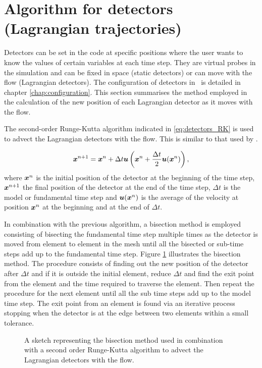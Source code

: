 \section{Algorithm for detectors (Lagrangian trajectories)}
  
Detectors can be set in the code at specific positions where the user wants
to know the values of certain variables at each time step. They are virtual
probes in the simulation and can be fixed in space (static detectors) or can
move with the flow (Lagrangian detectors). The configuration of detectors in
\fluidity\ is detailed in chapter
\ref{chap:configuration}. This section summarises the method
employed in the calculation of the new position of each Lagrangian detector
as it moves with the flow. 

The second-order Runge-Kutta algorithm indicated in \eqref{eq:detectors_RK}
is used to advect the Lagrangian detectors with the flow. This is similar to
that used by \cite{walters2007}.


\begin{equation}\label{eq:detectors_RK}
{\mbox{\boldmath$x$}}^{n+1} =  {\mbox{\boldmath$x$}}^{n} + \Delta t {\mbox{\boldmath$u$}}\left({\mbox{\boldmath$x$}}^{n} + \frac{\Delta t }{2} {\mbox{\boldmath$u$}}({\mbox{\boldmath$x$}}^{n})\right),
\end{equation}
where ${\mbox{\boldmath$x$}}^{n}$ is the initial position of the detector at the beginning of the time step, ${\mbox{\boldmath$x$}}^{n+1}$ the final position of the detector at the end of the time step, $\Delta t$ is the model or fundamental time step and ${\mbox{\boldmath$u$}}({\mbox{\boldmath$x$}}^{n})$ is the average of the velocity at position ${\mbox{\boldmath$x$}}^{n}$ at the beginning and at the end of $\Delta t$. 

In combination with the previous algorithm, a bisection method is employed consisting of bisecting the fundamental time step multiple times as the detector is moved from element to element in the mesh until all the bisected or sub-time steps add up to the fundamental time step. Figure \ref{fig:bisection_menthod} illustrates the bisection method. The procedure consists of finding out the new position of the detector after $\Delta t$ and if it is outside the initial element, reduce $\Delta t$ and find the exit point from the element and the time required to traverse the element. Then repeat the procedure for the next element until all the sub time steps add up to the model time step. The exit point from an element is found via an iterative process stopping when the detector is at the edge between two elements within a small tolerance.
% 
\begin{figure}[ht]
  \centering
  \caption{A sketch representing the bisection method used in combination with a second order Runge-Kutta algorithm to advect the Lagrangian detectors with the flow.}
  \label{fig:bisection_menthod}
\end{figure}



